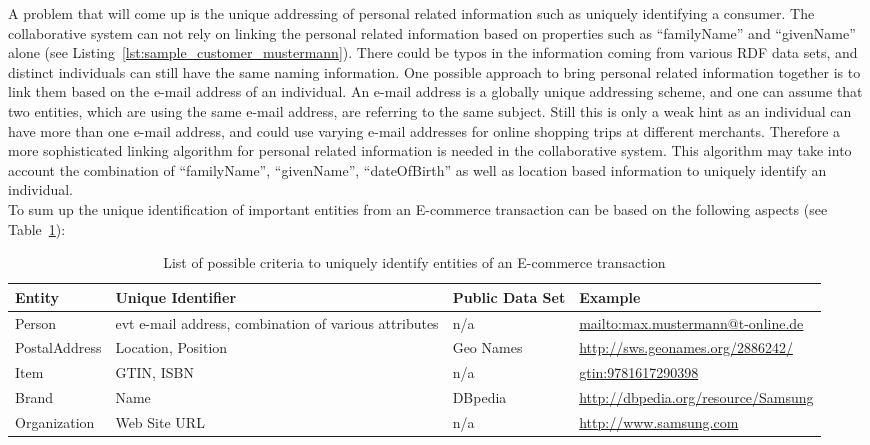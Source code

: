 A problem that will come up is the unique addressing of personal related information such as uniquely identifying a consumer. The collaborative system can not rely on linking the personal related information based on properties such as ``familyName'' and ``givenName'' alone (see Listing~\ref{lst:sample_customer_mustermann}). There could be typos in the information coming from various \gls{RDF} data sets, and distinct individuals can still have the same naming information. One possible approach to bring personal related information together is to link them based on the e-mail address of an individual. An e-mail address is a globally unique addressing scheme, and one can assume that two entities, which are using the same e-mail address, are referring to the same subject. Still this is only a weak hint as an individual can have more than one e-mail address, and could use varying e-mail addresses for online shopping trips at different merchants. Therefore a more sophisticated linking algorithm for personal related information is needed in the collaborative system. This algorithm may take into account the combination of ``familyName'', ``givenName'', ``dateOfBirth'' as well as location based information to uniquely identify an individual. \\

To sum up the unique identification of important entities from an \gls{E-commerce} transaction can be based on the following aspects (see Table~\ref{tab:mapping_information}): \@

\begin{table}[H]
\centering
\begin{tabular}{lp{3.3cm}lp{4cm}}
\hline
\textbf{Entity} & \textbf{Unique Identifier} & \textbf{Public Data Set} & \textbf{Example} \\
\hline
Person & \gls{evt} e-mail address, combination of various attributes & n/a & \url{mailto:max.mustermann@t-online.de} \\
\hline
PostalAddress & Location, Position & Geo Names & \url{http://sws.geonames.org/2886242/} \\
\hline
Item & \gls{GTIN}, \gls{ISBN} & n/a & \url{gtin:9781617290398} \\
\hline
Brand & Name & DBpedia & \url{http://dbpedia.org/resource/Samsung} \\
\hline
Organization & Web Site \gls{URL} & n/a & \url{http://www.samsung.com} \\
\hline
\end{tabular}
\caption{List of possible criteria to uniquely identify entities of an \gls{E-commerce} transaction}
\label{tab:mapping_information}
\end{table}

